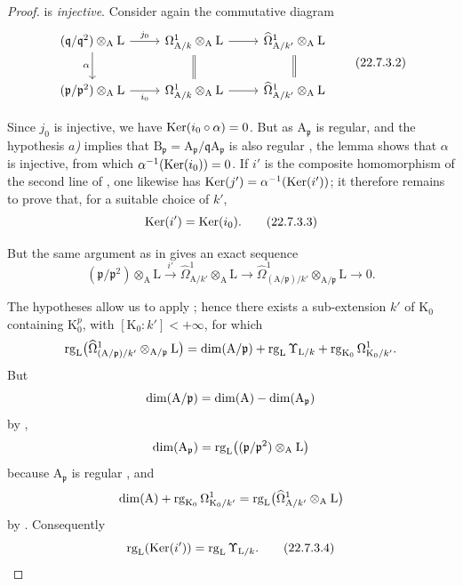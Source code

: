 \begin{proof}
is \emph{injective}.
Consider again the commutative diagram
\[
\label{0.22.7.3.2}
  \begin{tikzcd}
    (\mathfrak{q}/\mathfrak{q}^2)\otimes_\mathrm{A}\mathrm{L}
      \ar[r,"j_0"] \ar[d,"\alpha"'] &
    \Omega^1_{\mathrm{A}/k}\otimes_\mathrm{A}\mathrm{L}
      \ar[r] \ar[d,equal] &
    \widehat{\Omega}^1_{\mathrm{A}/k'}\otimes_\mathrm{A}\mathrm{L}
      \ar[d,equal]\\
    (\mathfrak{p}/\mathfrak{p}^2)\otimes_\mathrm{A}\mathrm{L}
      \ar[r,"i_0"'] &
    \Omega^1_{\mathrm{A}/k}\otimes_\mathrm{A}\mathrm{L} \ar[r] &
    \widehat{\Omega}^1_{\mathrm{A}/k'}\otimes_\mathrm{A}\mathrm{L}
  \end{tikzcd}
  \tag{22.7.3.2}
\]

Since $j_0$ is injective, we have $\operatorname{Ker}(i_0\circ\alpha)=0$.
But as $\mathrm{A}_\mathfrak{p}$ is regular, and the hypothesis \emph{$a$)} implies that $\mathrm{B}_\mathfrak{p}=\mathrm{A}_\mathfrak{p}/\mathfrak{q}\mathrm{A}_\mathfrak{p}$ is also regular , the lemma  shows that $\alpha$ is injective, from which $\alpha^{-1}(\operatorname{Ker}(i_0))=0$.
If $i'$ is the composite homomorphism of the second line of
, one likewise has
$\operatorname{Ker}(j')=\alpha^{-1}(\operatorname{Ker}(i'))$; it therefore remains to prove that, for a
suitable choice of $k'$,
\begin{equation}
\label{0.22.7.3.3}
  \operatorname{Ker}(i')=\operatorname{Ker}(i_0).
  \tag{22.7.3.3}
\end{equation}

But the same argument as in  gives an exact sequence
\[
  (\mathfrak{p}/\mathfrak{p}^2)\otimes_\mathrm{A}\mathrm{L}
  \xrightarrow{i'}\widehat{\Omega}^1_{\mathrm{A}/k'}
  \otimes_\mathrm{A}\mathrm{L}\longrightarrow
  \widehat{\Omega}^1_{(\mathrm{A}/\mathfrak{p})/k'}
  \otimes_{\mathrm{A}/\mathfrak{p}}\mathrm{L}\longrightarrow 0.
\]

The hypotheses allow us to apply ; hence there exists a
sub-extension $k'$ of $\mathrm{K}_0$ containing $\mathrm{K}_0^p$, with
$[\mathrm{K}_0:k']<+\infty$, for which
\[
  \operatorname{rg}_\mathrm{L}\bigl(
  \widehat{\Omega}^1_{(\mathrm{A}/\mathfrak{p})/k'}
  \otimes_{\mathrm{A}/\mathfrak{p}}\mathrm{L}\bigr)
  =\dim(\mathrm{A}/\mathfrak{p})
  +\operatorname{rg}_\mathrm{L}\Upsilon_{\mathrm{L}/k}
  +\operatorname{rg}_{\mathrm{K}_0}\Omega^1_{\mathrm{K}_0/k'}.
\]
But
\[
  \dim(\mathrm{A}/\mathfrak{p})
  =\dim(\mathrm{A})-\dim(\mathrm{A}_\mathfrak{p})
\]
by ,
\[
  \dim(\mathrm{A}_\mathfrak{p})
  =\operatorname{rg}_\mathrm{L}\bigl((\mathfrak{p}/\mathfrak{p}^2)
  \otimes_\mathrm{A}\mathrm{L}\bigr)
\]
because $\mathrm{A}_\mathfrak{p}$ is regular , and
\[
  \dim(\mathrm{A})+\operatorname{rg}_{\mathrm{K}_0}\Omega^1_{\mathrm{K}_0/k'}
  =\operatorname{rg}_\mathrm{L}\bigl(
  \widehat{\Omega}^1_{\mathrm{A}/k'}\otimes_\mathrm{A}\mathrm{L}\bigr)
\]
by . Consequently
\begin{equation}
\label{0.22.7.3.4}
  \operatorname{rg}_\mathrm{L}(\operatorname{Ker}(i'))=\operatorname{rg}_\mathrm{L}\Upsilon_{\mathrm{L}/k}.
  \tag{22.7.3.4}
\end{equation}


\end{proof}
